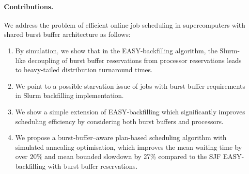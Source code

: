 \documentclass[runningheads]{llncs}
\begin{document}
\paragraph{Contributions.}
We address the problem of efficient online job scheduling in supercomputers with shared burst buffer architecture as follows:
\begin{enumerate}
\item By simulation,
  we show that in the EASY-backfilling algorithm, the Slurm-like decoupling of burst buffer reservations from processor reservations leads to heavy-tailed distribution turnaround times.
    \item We point to a possible starvation issue of jobs with burst buffer requirements in Slurm backfilling implementation.
    \item We show a simple extension of EASY-backfilling which significantly improves scheduling efficiency by considering both burst buffers and processors.
    \item We propose a burst-buffer--aware plan-based scheduling algorithm with simulated annealing optimisation, which improves the mean waiting time by over 20\% and mean bounded slowdown by 27\% compared to the SJF EASY-backfilling with burst buffer reservations.
\end{enumerate}
\end{document}
